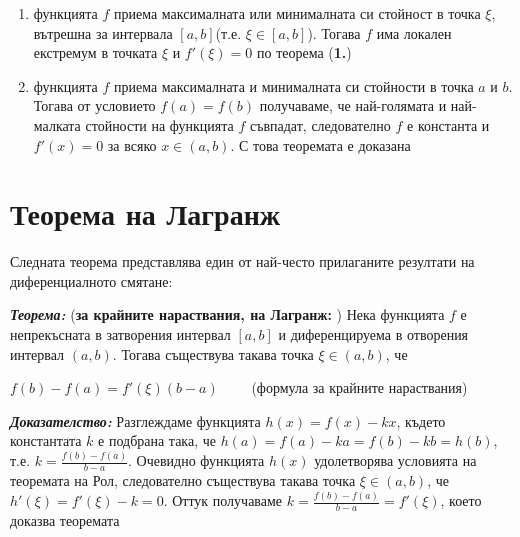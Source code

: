 \documentclass[11pt]{article} %
\newcommand{\italicBold}[1]{\textbf{\emph{#1}}}
\newcommand{\theorem}{\italicBold{Теорема: }}
\newcommand{\proof}{\italicBold{Доказателство: }}
\newcommand{\enumNum}{\renewcommand{\theenumi}{\arabic{enumi}}}
\begin{document}
\enumNum
\begin{enumerate}
	\item функцията $f$ приема максималната или минималната си стойност в точка $\xi$, вътрешна за интервала $[a,b]$(т.е. $\xi \in [a,b]$). Тогава $f$ има локален екстремум в точката $\xi$ и $f'(\xi) = 0$ по теорема (\textbf{1.})\\
	\item функцията $f$ приема максималната и минималната си стойности в точка $a$ и $b$. Тогава от условието $f(a) = f(b)$ получаваме, че най-голямата и най-малката стойности на функцията $f$ съвпадат, следователно $f$ е константа и $f'(x)=0$ за всяко $x \in (a,b)$. С това теоремата е доказана\\\par
\end{enumerate}

\section{Теорема на Лагранж}
Следната теорема представлява един от най-често прилаганите резултати на диференциалното смятане:\par
\theorem (\textbf{за крайните нараствания, на Лагранж: }) Нека функцията $f$ е непрекъсната в затворения интервал $[a,b]$ и диференцируема в отворения интервал $(a,b)$. Тогава съществува такава точка $\xi \in (a,b)$, че \\
\centerline{$f(b)-f(a)=f'(\xi)(b-a) \qquad$ (формула за крайните нараствания)}
\par
\proof Разглеждаме функцията $h(x)=f(x)-kx$, където константата $k$ е подбрана така, че $h(a)=f(a)-ka=f(b)-kb=h(b)$, т.е. $k = \frac{f(b)-f(a)}{b-a}$. Очевидно функцията $h(x)$ удолетворява условията на теоремата на Рол, следователно съществува такава точка $\xi \in (a,b)$, че $h'(\xi)=f'(\xi)-k=0$. Оттук получаваме $k = \frac{f(b)-f(a)}{b-a} = f'(\xi)$, което доказва теоремата \\\par
\end{document}
